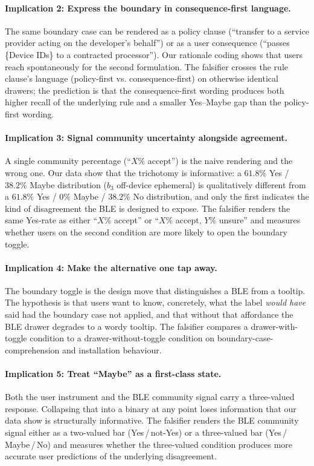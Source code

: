 \documentclass[11pt,a4paper]{article}
\begin{document}
\paragraph{Implication 2: Express the boundary in consequence-first
language.} The same boundary case can be rendered as a policy
clause (``transfer to a service provider acting on the developer's
behalf'') or as a user consequence (``passes \{Device IDs\} to a
contracted processor''). Our rationale coding shows that users
reach spontaneously for the second formulation. The falsifier
crosses the rule clause's language (policy-first vs.
consequence-first) on otherwise identical drawers; the prediction
is that the consequence-first wording produces both higher recall
of the underlying rule and a smaller Yes--Maybe gap than the
policy-first wording.

\paragraph{Implication 3: Signal community uncertainty alongside
agreement.} A single community percentage (``$X\%$ accept'') is the
naive rendering and the wrong one. Our data show that the
trichotomy is informative: a $61.8\%$ Yes / $38.2\%$ Maybe
distribution ($b_3$ off-device ephemeral) is qualitatively different
from a $61.8\%$ Yes / $0\%$ Maybe / $38.2\%$ No distribution, and
only the first indicates the kind of disagreement the BLE is
designed to expose.
The falsifier renders the same Yes-rate as either ``$X\%$ accept''
or ``$X\%$ accept, $Y\%$ unsure'' and measures whether users on
the second condition are more likely to open the boundary toggle.

\paragraph{Implication 4: Make the alternative one tap away.} The
boundary toggle is the design move that distinguishes a BLE from a
tooltip. The hypothesis is that users want to know, concretely,
what the label \emph{would have} said had the boundary case not
applied, and that without that affordance the BLE drawer degrades
to a wordy tooltip. The falsifier compares a drawer-with-toggle
condition to a drawer-without-toggle condition on
boundary-case-comprehension and installation behaviour.

\paragraph{Implication 5: Treat ``Maybe'' as a first-class state.}
Both the user instrument and the BLE community signal carry a
three-valued response. Collapsing that into a binary at any point
loses information that our data show is structurally informative.
The falsifier renders the BLE community signal either as a
two-valued bar (Yes\,/\,not-Yes) or a three-valued bar
(Yes\,/\,Maybe\,/\,No) and measures whether the three-valued
condition produces more accurate user predictions of the
underlying disagreement.
\end{document}
